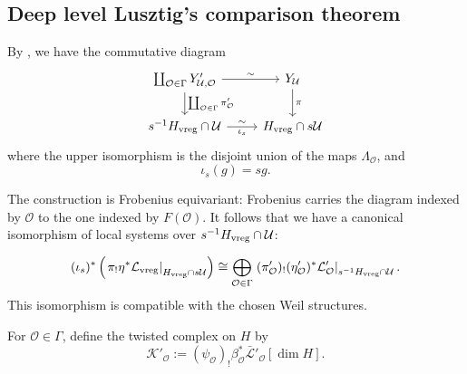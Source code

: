 \documentclass[11pt,letterpaper]{amsart}
\theoremstyle{definition}
\numberwithin{equation}{section}
\numberwithin{theorem}{section}
\begin{document}
\subsection{Deep level Lusztig's comparison theorem}
By , we have the
commutative diagram
\begin{equation}
\begin{tikzcd}
     \coprod_{\mathcal{O}\in \Gamma}Y'_{\mathcal{U},\mathcal{O}} \arrow[r,"\sim" sloped] \arrow[d,"\coprod_{\mathcal{O}\in \Gamma}{\pi'_{\mathcal{O}}}"] &
   Y_{\mathcal{U}}\arrow[d, "\pi"] \\
     s^{-1}H_{\rm{vreg}}\cap \mathcal{U} \arrow[r, "\sim" sloped, "\iota_s"'] &
    H_{\rm{vreg}}\cap s\mathcal{U}
\end{tikzcd}
\end{equation}
where the upper isomorphism is the disjoint union of the maps
$\Lambda_{\mathcal O}$, and
\[
\iota_s(g)=sg.
\]



The construction is Frobenius equivariant: Frobenius carries the diagram
indexed by $\mathcal O$ to the one indexed by $F(\mathcal O)$.  It follows
that we have a canonical isomorphism of local systems over
$s^{-1}H_{\rm{vreg}}\cap \mathcal{U}$:

\begin{equation}\label{loc0}
 (\iota_s)^*\left(
   \left.\pi_!\eta^*\mathcal L_{\rm vreg}
   \right|_{H_{\rm vreg}\cap s\mathcal U}
 \right)
 \cong
 \bigoplus_{\mathcal O\in\Gamma}
 \left.(\pi'_{\mathcal O})_!(\eta'_{\mathcal O})^*
 \mathcal L'_{\mathcal O}
 \right|_{s^{-1}H_{\rm vreg}\cap\mathcal U}.
\end{equation}
This isomorphism is compatible with the chosen Weil structures.

For $\mathcal O\in\Gamma$, define the twisted complex on $H$ by
\[
 \mathcal K'_{\mathcal O}
 :=({\psi_{\mathcal O}})_!
     \beta_{\mathcal O}^*\bar{\mathcal L}'_{\mathcal O}[\dim H].
\]
\end{document}
